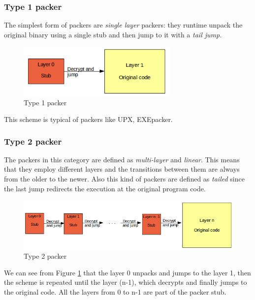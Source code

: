 \subsubsection{Type 1 packer}
The simplest form of packers are \textit{single layer} packers: they runtime unpack the original binary using a single stub and then jump to it with a \textit{tail jump}. 
\begin{figure}[!ht]
	\begin{center}
   		\includegraphics[width=0.7\textwidth]{pictures/packer_type_1.png} 
	\end{center}
	\caption{Type 1 packer}
\end{figure}
This scheme is typical of packers like UPX, EXEpacker.

\subsubsection{Type 2 packer}
The packers in this category are defined as \textit{multi-layer} and \textit{linear}. This means that they employ different layers and the transitions between them are always from the older to the newer. Also this kind of packers are defined as \textit{tailed} since the last jump redirects the execution at the original program code.\\
\begin{figure}[!ht]
	\begin{center}
   		\includegraphics[width=\textwidth]{pictures/packer_type_2.png}
	\end{center}
	\caption{Type 2 packer}
	\label{Type 2 packer}
\end{figure}
We can see from Figure \ref{Type 2 packer} that the layer 0 unpacks and jumps to the layer 1, then the scheme is repeated until the layer (n-1), which decrypts and finally jumps to the original code. All the layers from 0 to n-1 are part of the packer stub.

